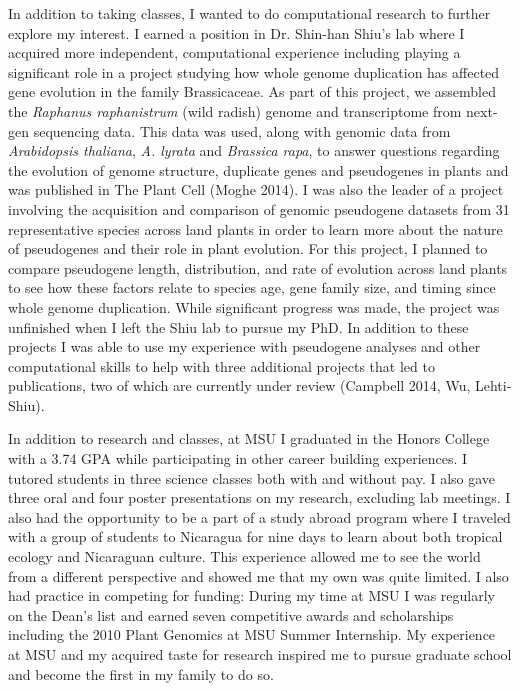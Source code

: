 \documentclass[12pt]{amsart}
\begin{document}
In addition to taking classes, I wanted to do computational research to further explore my interest.  
I earned a position in Dr. Shin-han Shiu's lab where I acquired more independent,  computational experience including playing a significant role in a project studying how whole genome duplication has affected gene evolution in the family Brassicaceae.  
As part of this project, we assembled the \textit{Raphanus raphanistrum} (wild radish) genome and transcriptome from next-gen sequencing data.  
This data was used, along with genomic data from \textit{Arabidopsis thaliana}, \textit{A. lyrata} and \textit{Brassica rapa}, to answer questions regarding the evolution of genome structure, duplicate genes and pseudogenes in plants and was published in The Plant Cell (Moghe 2014). 
I was also the leader of a project involving the acquisition and comparison of genomic pseudogene datasets from 31 representative species across land plants in order to learn more about the nature of pseudogenes and their role in plant evolution.  
For this project, I planned to compare pseudogene length, distribution, and rate of evolution across land plants to see how these factors relate to species age, gene family size, and timing since whole genome duplication.  
While significant progress was made, the project was unfinished when I left the Shiu lab to pursue my PhD.  
In addition to these projects I was able to use my experience with pseudogene analyses and other computational skills to help with three additional projects that led to publications, two of which are currently under review (Campbell 2014, Wu, Lehti-Shiu).

In addition to research and classes, at MSU I graduated in the Honors College with a 3.74 GPA while participating in other career building experiences.  
I tutored students in three science classes both with and without pay.
I also gave three oral and four poster presentations on my research, excluding lab meetings.
I also had the opportunity to be a part of a study abroad program where I traveled with a group of students to Nicaragua for nine days to learn about both tropical ecology and Nicaraguan culture. 
This experience allowed me to see the world from a different perspective and showed me that my own was quite limited.
I also had practice in competing for funding:
During my time at MSU I was regularly on the Dean's list and earned seven competitive awards and scholarships including the 2010 Plant Genomics at MSU Summer Internship. 
My experience at MSU and my acquired taste for research inspired me to pursue graduate school and become the first in my family to do so.
\end{document}
